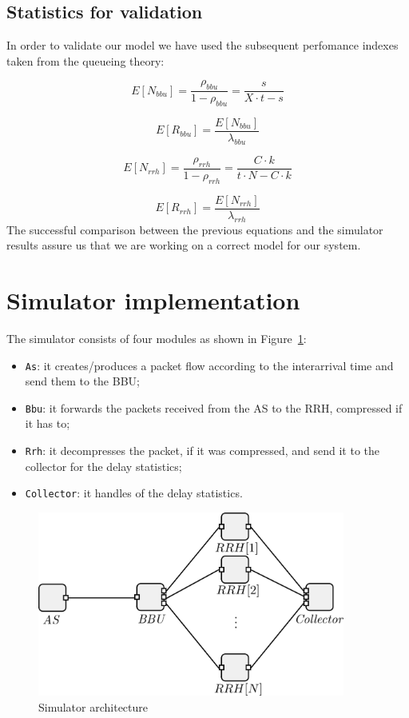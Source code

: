 \documentclass[11pt,a4paper,oneside, openright]{article}
\begin{document}
\subsection{Statistics for validation}
In order to validate our model we have used the subsequent perfomance indexes taken from the queueing theory:

$$ E[N_{bbu}] = \frac{\rho_{bbu}}{1 - \rho_{bbu}} = \frac{s}{X \cdot t - s}$$

$$ E[R_{bbu}] = \frac{E[N_{bbu}]}{\lambda_{bbu}} $$

$$ E[N_{rrh}] = \frac{\rho_{rrh}}{1 - \rho_{rrh}} = \frac{C \cdot k}{t \cdot N - C \cdot k}$$

$$ E[R_{rrh}] = \frac{E[N_{rrh}]}{\lambda_{rrh}} $$
The successful comparison between the previous equations and the simulator results assure us that we are working on a correct model for our system.

\section{Simulator implementation}
The simulator consists of four modules as shown in Figure~\ref{fig:simulator}:
\begin{itemize}
  \item \texttt{As}: it creates/produces a packet flow according to the interarrival time and send them to the BBU;
  \item \texttt{Bbu}: it forwards the packets received from the AS to the RRH, compressed if it has to;
  \item \texttt{Rrh}: it decompresses the packet, if it was compressed, and send it to the collector for the delay statistics;
  \item \texttt{Collector}: it handles of the delay statistics.
\end{itemize}

\begin{figure}[h]
    \centering
    \includegraphics[width=0.9\textwidth]{images/simulator}
    \caption{Simulator architecture}
    \label{fig:simulator}
\end{figure}
\end{document}
